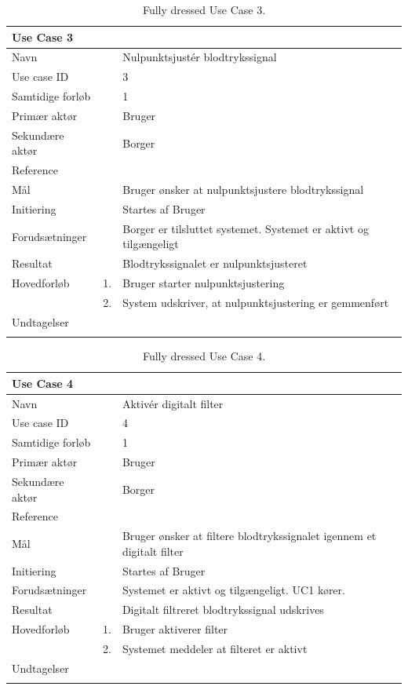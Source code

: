 \begin{longtabu} to  %
    {\large \textbf{Use Case 3}} && \\
    \toprule
    Navn &&    Nulpunktsjustér blodtrykssignal\\
    Use case ID &&    3\\
    Samtidige forløb &&    1\\
    Primær aktør &&    Bruger\\
    Sekundære aktør &&	Borger \\
    Reference &&      \\
    Mål &&    Bruger ønsker at nulpunktsjustere blodtrykssignal\\
    Initiering &&	Startes af Bruger\\
    Forudsætninger &&  Borger er tilsluttet systemet. Systemet er aktivt og tilgængeligt\\
    Resultat &&		Blodtrykssignalet er nulpunktsjusteret\\ \midrule
    Hovedforløb &    1. &    Bruger starter nulpunktsjustering\\[-1ex]   						 	
                &    2. &    System udskriver, at nulpunktsjustering er gemmenført\newline\\ \midrule
                
    Undtagelser &     &      \\ \bottomrule
\caption{Fully dressed Use Case 3.}
\label{UC3}
\end{longtabu}

\begin{longtabu} to  %
    {\large \textbf{Use Case 4}} && \\
    \toprule
    Navn &&    Aktivér digitalt filter\\
    Use case ID &&    4\\
    Samtidige forløb &&   1\\
    Primær aktør &&    Bruger\\
    Sekundære aktør &&	Borger \\
    Reference &&      \\
    Mål &&    Bruger ønsker at filtere blodtrykssignalet igennem et digitalt filter\\
    Initiering &&	Startes af Bruger\\
    Forudsætninger &&  Systemet er aktivt og tilgængeligt. UC1 kører.  \\
    Resultat &&		Digitalt filtreret blodtrykssignal udskrives                 \\ \midrule
    Hovedforløb &    1. &    Bruger aktiverer filter\\[-1ex]   						 	
                &    2. &    Systemet meddeler at filteret er aktivt\newline\\ \midrule
                
    Undtagelser &     &      \\ \bottomrule
\caption{Fully dressed Use Case 4.}
\label{UC4}
\end{longtabu}

